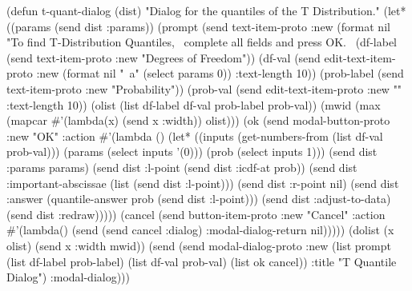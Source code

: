 \nwenddocs{}\endmoddef
(defun t-quant-dialog (dist)
  "Dialog for the quantiles of the T Distribution."
  (let* ((params (send dist :params))
         (prompt (send text-item-proto :new
                  (format nil 
                    "To find T-Distribution Quantiles,~%
                     complete all fields and press OK.~%
         (df-label (send text-item-proto :new "Degrees of Freedom"))
         (df-val (send edit-text-item-proto :new
                       (format nil "~a" (select params 0)) :text-length 10))
         (prob-label (send text-item-proto :new "Probability"))
         (prob-val (send edit-text-item-proto :new "" :text-length 10))
         (olist (list df-label df-val prob-label prob-val))
         (mwid (max (mapcar #'(lambda(x) (send x :width)) olist)))
         (ok (send modal-button-proto :new "OK"
                   :action
                   #'(lambda ()
                      (let* ((inputs (get-numbers-from 
                                      (list df-val prob-val)))
                             (params (select inputs '(0)))
                             (prob (select inputs 1)))
                         (send dist :params params)
                         (send dist :l-point (send dist :icdf-at prob))
                         (send dist :important-abscissae 
                               (list (send dist :l-point)))
                         (send dist :r-point nil)
                         (send dist :answer
                              (quantile-answer prob (send dist :l-point)))
                         (send dist :adjust-to-data)
                         (send dist :redraw)))))
         (cancel (send button-item-proto :new "Cancel"
                       :action
                       #'(lambda()
                           (send (send cancel :dialog)
                                 :modal-dialog-return nil)))))
    (dolist (x olist)
            (send x :width mwid))
    (send (send modal-dialog-proto
                :new (list prompt
                           (list df-label prob-label)
                           (list df-val prob-val)
                           (list ok cancel))
                :title "T Quantile Dialog") :modal-dialog)))
\eatline
